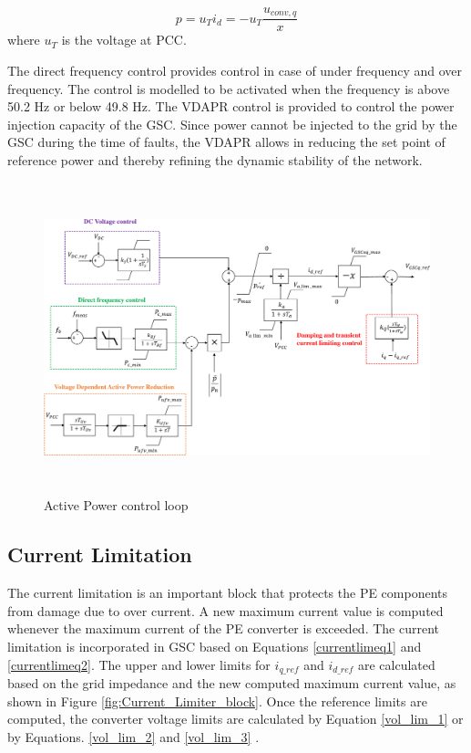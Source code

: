 \begin{equation}\label{P_eq}
    p = u_Ti_d = -u_T\frac{u_{conv,q}}{x}
\end{equation}
where $u_T$ is the voltage at \gls{PCC}.

The direct frequency control provides control in case of under frequency and over frequency. The control is modelled to be activated when the frequency is above 50.2 Hz or below 49.8 Hz.
The VDAPR control is provided to control the power injection capacity of the \gls{GSC}. Since power cannot be injected to the grid by the \gls{GSC} during the time of faults, the VDAPR allows in reducing the set point of reference power and thereby refining the dynamic stability of the network. 
\begin{figure}[H]
\centering
    \includegraphics[height = 9cm,width = 14.5cm]{Diagrams/Chapter_3/Active_power_loop_withfreq.pdf}
    \caption{Active Power control loop \cite{korai_dynamic_2019}}
    \label{fig:Active_Power_Control_Loop}
\end{figure}

\subsection{Current Limitation}\label{currentlimitation_RSCAD}
The current limitation is an important block that protects the \gls{PE} components from damage due to over current. A new maximum current value is computed whenever the maximum current of the \gls{PE} converter is exceeded. The current limitation is incorporated in \gls{GSC} based on Equations \ref{currentlimeq1} and \ref{currentlimeq2}. The upper and lower limits for $i_{q\_ref}$ and $i_{d\_ref}$ are calculated based on the grid impedance and the new computed maximum current value, as shown in Figure \ref{fig:Current_Limiter_block}. 
Once the reference limits are computed, the converter voltage limits are calculated by Equation \ref{vol_lim_1} or by Equations. \ref{vol_lim_2} and \ref{vol_lim_3} \cite{korai_dynamic_2019}.

